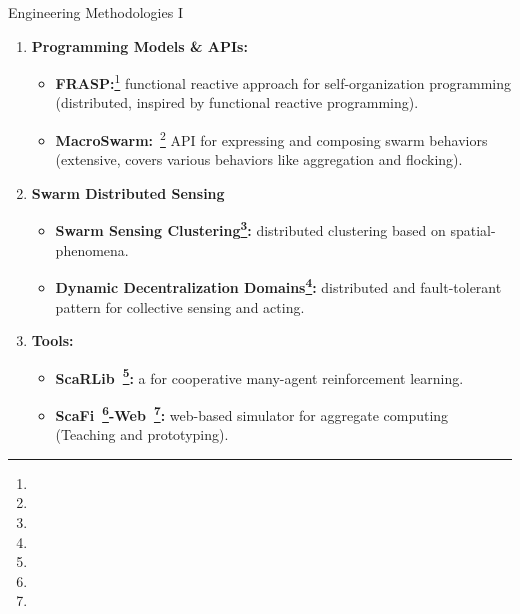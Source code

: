 \documentclass[presentation, 8pt,169]{beamer}\mode<presentation>{\usetheme{AMSBolognaFC}}
\begin{document}
\begin{frame}[fragile]{Engineering Methodologies I}

  \begin{enumerate}
  \item \textbf{Programming Models \& APIs:}
  
  \begin{itemize}
  \item \textbf{FRASP:}\footnote{} functional reactive approach for self-organization programming (distributed, inspired by functional reactive programming).
  \item \textbf{MacroSwarm:}~\footnote{} API for expressing and composing swarm behaviors (extensive, covers various behaviors like aggregation and flocking).
  \end{itemize}

  \item \textbf{Swarm Distributed Sensing}
  
  \begin{itemize}
  \item \textbf{Swarm Sensing Clustering\footnote{}:} distributed clustering based on spatial-phenomena.
  \item \textbf{Dynamic Decentralization Domains\footnote{}:} distributed and fault-tolerant pattern for collective sensing and acting.
  \end{itemize}

  
 
  \item \textbf{Tools:}
  
  \begin{itemize}
  \item \textbf{ScaRLib~\footnote{}:} a for cooperative many-agent reinforcement learning.
  \item \textbf{ScaFi~\footnote{}-Web~\footnote{}:} web-based simulator for aggregate computing (Teaching and prototyping).
  \end{itemize}
\end{enumerate}
\end{frame}
\end{document}
